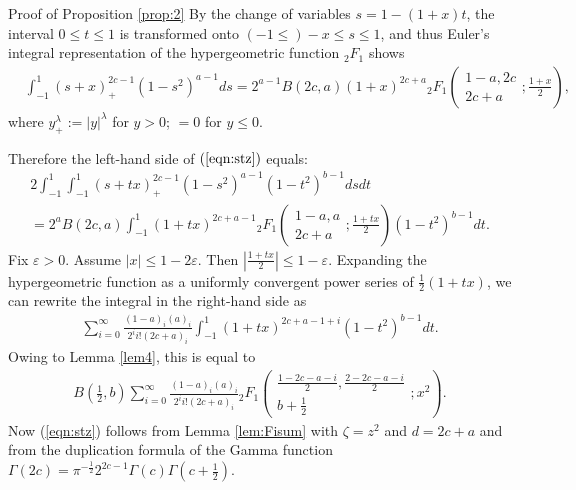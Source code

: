 \documentclass[12pt]{article}
\numberwithin{equation}{section}
\newcommand{\assign}{:=}
\newenvironment{proof*}[1]{\noindent\textbf{#1\ }}{\hspace*{\fill}$\Box$\medskip}
\newcommand{\mygrammarfootnote}[1]{}
\begin{document}
\begin{proof*}{Proof of Proposition \ref{prop:2}}
  By the change of variables $s = 1 - (1 + x) t$, the interval $0 \leqslant t
  \leqslant 1$ is transformed onto $(- 1 \leqslant) - x \leqslant s \leqslant
  1$, and thus Euler's integral representation of the hypergeometric function
  $_2 F_1$ shows
  \begin{eqnarray}
    & \displaystyle\int_{- 1}^1 (s + x)_+^{2 c - 1} (1 - s^2)^{a - 1} d s = 2^{a - 1} B (2
    c, a) (1 + x)^{2 c + a}{}_2 F_1 \left( \begin{array}{c}
      1 - a, 2 c\\
      2 c + a
    \end{array} ; \frac{1 + x}{2} \right), &  \nonumber
  \end{eqnarray}
  where $y_+^{\lambda} \assign | y |^{\lambda}$ for $y > 0$; $= 0$ for $y
  \leqslant 0$.
  
  Therefore the left-hand side of $(\ref{eqn:stz})$ equals:
  \begin{eqnarray}
    & 2 \displaystyle\int_{- 1}^1 \displaystyle\int_{- 1}^1 (s + tx)_+^{2 c - 1} (1 - s^2)^{a - 1} (1 -
    t^2)^{b - 1} d s d t &  \nonumber\\
    & = 2^a B (2 c, a) \displaystyle\int_{- 1}^1 (1 + tx)^{2 c + a - 1}{}_2 F_1 \left(
    \begin{array}{c}
      1 - a, a\\
      2 c + a
    \end{array} ; \frac{1 + tx}{2} \right) (1 - t^2)^{b - 1} d t. &  \nonumber
  \end{eqnarray}
  Fix $\varepsilon > 0$. Assume $| x | \leqslant 1 - 2 \varepsilon$. Then
  $\left| \frac{1 + tx}{2} \right| \leqslant 1 - \varepsilon$. Expanding the
  hypergeometric function as a uniformly convergent power series of
  $\frac{1}{2} (1 + tx)$, we can rewrite the integral in the right-hand side
  as
  \begin{eqnarray}
    & \displaystyle\sum_{i = 0}^{\infty} \frac{(1 - a)_i (a)_i}{2^i i! (2 c + a)_i}
    \displaystyle\int_{- 1}^1 (1 + t x)^{2 c + a - 1 + i} (1 - t^2)^{b - 1} d t. & 
    \nonumber
  \end{eqnarray}
  Owing to Lemma \ref{lem4}, this is equal to
  \begin{eqnarray}
    & B \left( \frac{1}{2}, b \right) \displaystyle\sum_{i = 0}^{\infty} \frac{(1 - a)_i
    (a)_i}{2^i i! (2 c + a)_i}{}_2 F_1 \left( \begin{array}{c}
      \displaystyle\frac{1 - 2 c - a - i}{2}, \frac{2 - 2 c - a - i}{2}\\
      b + \frac{1}{2}
    \end{array} ; x^2 \right) . &  \nonumber
  \end{eqnarray}
  Now (\ref{eqn:stz}) follows from Lemma \ref{lem:Fisum} with $\zeta = z^2$
  and $d = 2 c + a$\mygrammarfootnote{maybe, we need a comma here?} and from the
  duplication formula of the Gamma function $\Gamma (2 c) = \pi^{-
  \frac{1}{2}} 2^{2 c - 1} \Gamma (c) \Gamma \left( c + \frac{1}{2} \right)$.
\end{proof*}
\end{document}
